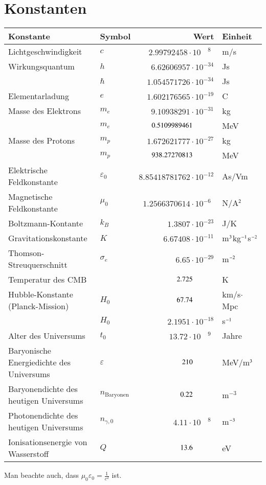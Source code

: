 \chapter{Konstanten\label{chapter:konstanten}}
\rhead{}
\begin{center}
\begin{tabular}{llrl}
\hline
Konstante&Symbol&Wert&Einheit\\
\hline
Lichtgeschwindigkeit     &$c$            &$2.99792458\cdot 10^{\phantom{-}8\phantom{0}}$&m/s\\
Wirkungsquantum          &$h$            &$6.62606957\cdot 10^{-34}$   &Js\\
                         &$\hbar$        &$1.054571726\cdot 10^{-34}$  &Js\\
Elementarladung          &$e$            &$1.602176565\cdot 10^{-19}$  &C \\
Masse des Elektrons      &$m_e$          &$9.10938291\cdot 10^{-31}$   &kg\\
                         &$m_e$          &$0.5109989461\phantom{\mathstrut\cdot 10^{-23}}$&MeV\\
Masse des Protons        &$m_p$          &$1.672621777\cdot 10^{-27}$  &kg\\
                         &$m_p$          &$938.27270813\phantom{\mathstrut\cdot10^{-23}}$&MeV\\
Elektrische Feldkonstante&$\varepsilon_0$&$8.85418781762\cdot 10^{-12}$&As/Vm\\
Magnetische Feldkonstante&$\mu_0$        &$1.2566370614\cdot 10^{-6\phantom{0}}$  &N/A$\mathstrut^2$\\
Boltzmann-Kontante       &$k_B$          &$1.3807\cdot 10^{-23}$&J/K\\
Gravitationskonstante    &$K$            &$6.67408\cdot 10^{-11}$&%
m$\mathstrut^3$kg$\mathstrut^{-1}$s$\mathstrut^{-2}$\\
Thomson-Streuquerschnitt &$\sigma_e$     &$6.65\cdot 10^{-29}$&m$\mathstrut^{-2}$\\
Temperatur des CMB       &               &$2.725\phantom{\mathstrut\cdot 10^{-23}}$               &K\\
Hubble-Konstante (Planck-Mission)&$H_0$&$67.74\phantom{\mathstrut\cdot 10^{-23}}$&km/s$\cdot$Mpc\\
                &$H_0$&$2.1951\cdot 10^{-18}$&s$\mathstrut^{-1}$\\
Alter des Universums&$t_0$&$13.72\cdot 10^{\phantom{-}9\phantom{0}}$&Jahre\\
Baryonische Energiedichte des Universums&$\varepsilon$&$210\phantom{\mathstrut\cdot 10^{-23}}$                &MeV/m$\mathstrut^3$\\
Baryonendichte des heutigen Universums&$n_{\text{Baryonen}}$&$0.22\phantom{\mathstrut\cdot 10^{-23}}$&$\text{m}^{-3}$\\
Photonendichte des heutigen Universums&$n_{\gamma,0}  $&$4.11\cdot 10^{\phantom{-}8\phantom{0}}$&m$\mathstrut^{-3}$\\
Ionisationsenergie von Wasserstoff&$Q$&$13.6\phantom{\mathstrut\cdot 10^{-23}}$&eV\\
\hline
\end{tabular}
\end{center}
Man beachte auch, dass $\displaystyle \mu_0\varepsilon_0=\frac1{c^2}$ ist.

